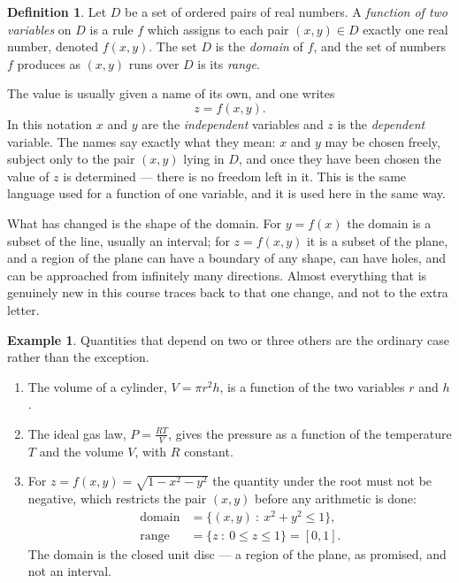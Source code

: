 \documentclass[11pt,a4paper]{article}
\theoremstyle{definition}
\newtheorem{defn}[thm]{Definition}
\newtheorem{exa}[thm]{Example}
\begin{document}
\begin{defn}
Let $D$ be a set of ordered pairs of real numbers. A \emph{function of two
variables} on $D$ is a rule $f$ which assigns to each pair $(x,y)\in D$ exactly
one real number, denoted $f(x,y)$. The set $D$ is the \emph{domain} of $f$, and
the set of numbers $f$ produces as $(x,y)$ runs over $D$ is its \emph{range}.
\end{defn}

The value is usually given a name of its own, and one writes
\[z = f(x,y).\]
In this notation $x$ and $y$ are the \emph{independent} variables and $z$ is the
\emph{dependent} variable. The names say exactly what they mean: $x$ and $y$ may
be chosen freely, subject only to the pair $(x,y)$ lying in $D$, and once they
have been chosen the value of $z$ is determined --- there is no freedom left in
it. This is the same language used for a function of one variable, and it is
used here in the same way.

What has changed is the shape of the domain. For $y = f(x)$ the domain is a
subset of the line, usually an interval; for $z = f(x,y)$ it is a subset of the
plane, and a region of the plane can have a boundary of any shape, can have
holes, and can be approached from infinitely many directions. Almost everything
that is genuinely new in this course traces back to that one change, and not to
the extra letter.

\begin{exa}
Quantities that depend on two or three others are the ordinary case rather than
the exception.
\begin{enumerate}
\item[$-$] The volume of a cylinder, $V = \pi r^2h$, is a function of the two
variables $r$ and $h$.

\item[$-$] The ideal gas law, $P = \frac{RT}{V}$, gives the
pressure as a function of the temperature $T$ and the volume $V$, with $R$
constant.

\item[$-$] For $z = f(x,y) = \sqrt{1 - x^2 - y^2}$ the quantity
under the root must not be negative, which restricts the pair $(x,y)$ before any
arithmetic is done:
\begin{align*}
\text{domain} & = \{(x,y)\ :\ x^2 + y^2 \leq 1\},\\[1ex]
\text{range}  & = \{z\ :\ 0\leq z \leq 1\} = [0,1].
\end{align*}
The domain is the closed unit disc --- a region of the plane, as promised, and
not an interval.
\end{enumerate}
\end{exa}
\end{document}
